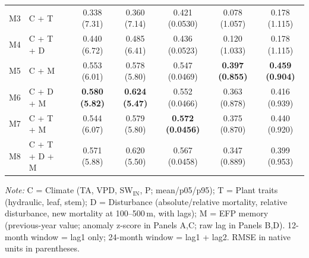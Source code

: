 \begin{table}[htbp]
\begin{tabular}{llcccccc}
M3 & C + T &  & 0.338 (7.31) & 0.360 (7.14) & 0.421 (0.0530) & 0.078 (1.057) & 0.178 (1.115) \\
M4 & C + T + D &  & 0.440 (6.72) & 0.485 (6.41) & 0.436 (0.0523) & 0.120 (1.033) & 0.178 (1.115) \\
M5 & C + M &  & 0.553 (6.01) & 0.578 (5.80) & 0.547 (0.0469) & \textbf{0.397 (0.855)} & \textbf{0.459 (0.904)} \\
M6 & C + D + M &  & \textbf{0.580 (5.82)} & \textbf{0.624 (5.47)} & 0.552 (0.0466) & 0.363 (0.878) & 0.416 (0.939) \\
M7 & C + T + M &  & 0.544 (6.07) & 0.579 (5.80) & \textbf{0.572 (0.0456)} & 0.375 (0.870) & 0.440 (0.920) \\
M8 & C + T + D + M &  & 0.571 (5.88) & 0.620 (5.50) & 0.567 (0.0458) & 0.347 (0.889) & 0.399 (0.953) \\
\midrule
\bottomrule
\end{tabular}
\vspace{2pt}
\begin{minipage}{\linewidth}
\footnotesize
\textit{Note:} C = Climate (TA, VPD, SW$_\mathrm{IN}$, P; mean/p05/p95); T = Plant traits (hydraulic, leaf, stem); D = Disturbance (absolute/relative mortality, relative disturbance, new mortality at 100--500\,m, with lags); M = EFP memory (previous-year value; anomaly z-score in Panels A,C; raw lag in Panels B,D). 12-month window = lag1 only; 24-month window = lag1 + lag2. RMSE in native units in parentheses.
\end{minipage}
\end{table}

